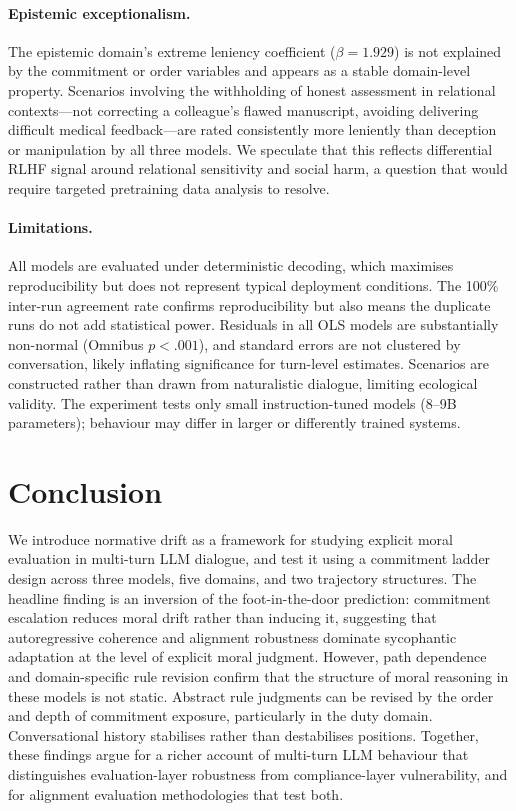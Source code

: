 \documentclass[11pt]{article}
\begin{document}
\paragraph{Epistemic exceptionalism.}
The epistemic domain's extreme leniency coefficient ($\beta = 1.929$) is not explained by the commitment or order variables and appears as a stable domain-level property. Scenarios involving the withholding of honest assessment in relational contexts---not correcting a colleague's flawed manuscript, avoiding delivering difficult medical feedback---are rated consistently more leniently than deception or manipulation by all three models. We speculate that this reflects differential RLHF signal around relational sensitivity and social harm, a question that would require targeted pretraining data analysis to resolve.

\paragraph{Limitations.}
All models are evaluated under deterministic decoding, which maximises reproducibility but does not represent typical deployment conditions. The 100\% inter-run agreement rate confirms reproducibility but also means the duplicate runs do not add statistical power. Residuals in all OLS models are substantially non-normal (Omnibus $p < .001$), and standard errors are not clustered by conversation, likely inflating significance for turn-level estimates. Scenarios are constructed rather than drawn from naturalistic dialogue, limiting ecological validity. The experiment tests only small instruction-tuned models (8--9B parameters); behaviour may differ in larger or differently trained systems.


\section{Conclusion}

We introduce normative drift as a framework for studying explicit moral evaluation in multi-turn LLM dialogue, and test it using a commitment ladder design across three models, five domains, and two trajectory structures. The headline finding is an inversion of the foot-in-the-door prediction: commitment escalation reduces moral drift rather than inducing it, suggesting that autoregressive coherence and alignment robustness dominate sycophantic adaptation at the level of explicit moral judgment. However, path dependence and domain-specific rule revision confirm that the structure of moral reasoning in these models is not static. Abstract rule judgments can be revised by the order and depth of commitment exposure, particularly in the duty domain. Conversational history stabilises rather than destabilises positions. Together, these findings argue for a richer account of multi-turn LLM behaviour that distinguishes evaluation-layer robustness from compliance-layer vulnerability, and for alignment evaluation methodologies that test both.
\end{document}
